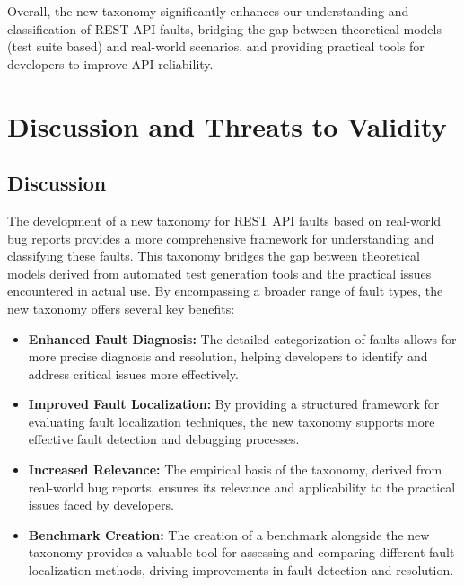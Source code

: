 \documentclass[conference]{IEEEtran}
\begin{document}
\begin{tcolorbox}[colback=gray!10, colframe=gray!80, title=RQ2]
Overall, the new taxonomy significantly enhances our understanding and classification of REST API faults, bridging the gap between theoretical models (test suite based) and real-world scenarios, 
and providing practical tools for developers to improve API reliability.

\end{tcolorbox}




\section{Discussion and Threats to Validity}
\label{sec:discussion}

\subsection{Discussion}

The development of a new taxonomy for REST API faults based on real-world bug reports provides a more comprehensive framework for understanding and classifying these faults. 
This taxonomy bridges the gap between theoretical models derived from automated test generation tools and the practical issues encountered in actual use. By encompassing a broader range of fault types, the new taxonomy offers several key benefits:

\begin{itemize}
    \item \textbf{Enhanced Fault Diagnosis:} The detailed categorization of faults allows for more precise diagnosis and resolution, helping developers to identify and address critical issues more effectively.
    \item \textbf{Improved Fault Localization:} By providing a structured framework for evaluating fault localization techniques, the new taxonomy supports more effective fault detection and debugging processes.
    \item \textbf{Increased Relevance:} The empirical basis of the taxonomy, derived from real-world bug reports, ensures its relevance and applicability to the practical issues faced by developers.
    \item \textbf{Benchmark Creation:} The creation of a benchmark alongside the new taxonomy provides a valuable tool for assessing and comparing different fault localization methods, driving improvements in fault detection and resolution.
\end{itemize}
\end{document}
